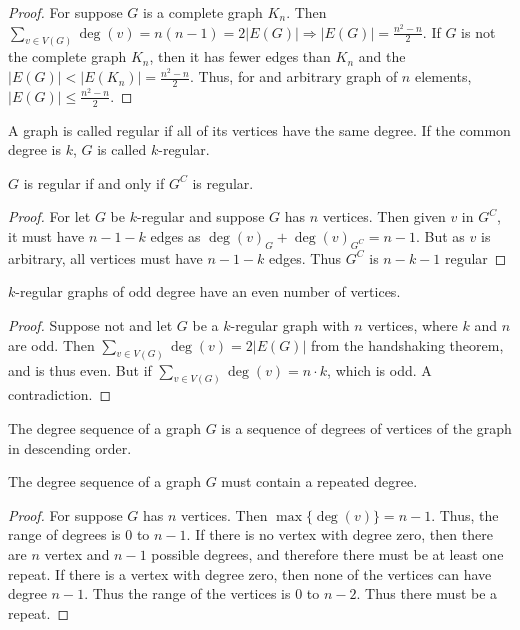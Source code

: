 \documentclass[crop=false,class=book,oneside]{standalone}
\begin{document}
\begin{proof}
For suppose $G$ is a complete graph $K_n$. Then $\sum_{v\in V(G)}\deg(v) = n(n-1) = 2|E(G)| \Rightarrow |E(G)| = \frac{n^2-n}{2}$. If $G$ is not the complete graph $K_n$, then it has fewer edges than $K_n$ and the $|E(G)| <|E(K_n)|= \frac{n^2-n}{2}$. Thus, for and arbitrary graph of $n$ elements, $|E(G)|\leq \frac{n^2-n}{2}$.
\end{proof}
\begin{definition}
A graph is called regular if all of its vertices have the same degree. If the common degree is $k$, $G$ is called $k$-regular.
\end{definition}
\begin{corollary}
$G$ is regular if and only if $G^C$ is regular. 
\end{corollary}
\begin{proof}
For let $G$ be $k$-regular and suppose $G$ has $n$ vertices. Then given $v$ in $G^C$, it must have $n-1-k$ edges as $\deg(v)_G + \deg(v)_{G^C} = n-1$. But as $v$ is arbitrary, all vertices must have $n-1-k$ edges. Thus $G^C$ is $n-k-1$ regular
\end{proof}
\begin{corollary}
$k$-regular graphs of odd degree have an even number of vertices.
\end{corollary}
\begin{proof}
Suppose not and let $G$ be a $k$-regular graph with $n$ vertices, where $k$ and $n$ are odd. Then $\sum_{v\in V(G)}\deg(v) = 2|E(G)|$ from the handshaking theorem, and is thus even. But if $\sum_{v\in V(G)}\deg(v) = n\cdot k$, which is odd. A contradiction.
\end{proof}
\begin{definition}
The degree sequence of a graph $G$ is a sequence of degrees of vertices of the graph in descending order.
\end{definition}
\begin{theorem}
The degree sequence of a graph $G$ must contain a repeated degree.
\end{theorem}
\begin{proof}
For suppose $G$ has $n$ vertices. Then $\max\{\deg(v)\} = n-1$. Thus, the range of degrees is $0$ to $n-1$. If there is no vertex with degree zero, then there are $n$ vertex and $n-1$ possible degrees, and therefore there must be at least one repeat. If there is a vertex with degree zero, then none of the vertices can have degree $n-1$. Thus the range of the vertices is $0$ to $n-2$. Thus there must be a repeat. 
\end{proof}
\end{document}
